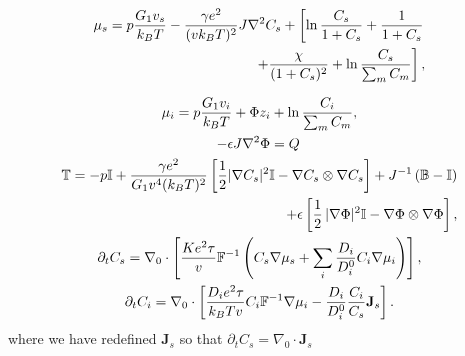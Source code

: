 \begin{gather}
\begin{aligned}
\mu_s = p \frac{G_1v_s}{k_BT} - \frac{\gamma e^2}{(vk_BT)^2} J \nabla^2 C_s + \left[\ln \frac{C_s}{1+C_s} + \frac{1}{1+C_s}\right.\\
\left.\ \ \ \ \ \ +\frac{\chi}{(1+C_s)^2} + \ln \frac{C_s}{\sum_m C_m} \right], 
\end{aligned}\\[2.5mm]
\mu_i = p \frac{G_1v_i}{k_BT} + \Phi z_i + \ln \frac{C_i}{\sum_m C_m} ,\\
-\epsilon J \nabla^2 \Phi = Q\, \\
\begin{aligned}
\mathbb{T}= -p \mathbb{I} +\frac{\gamma e^2}{G_1v^4(k_BT)^2} \left[\frac{1}{2} |\nabla C_s|^2\mathbb{I} - \nabla C_s \otimes \nabla C_s\right]+ J^{-1}\left(\mathbb{B}-\mathbb{I}\right)\\
+ \epsilon \left[\frac{1}{2} \,|\nabla \Phi|^2\mathbb{I} -\nabla \Phi \otimes \nabla \Phi\right],
\end{aligned}\\
\partial_t C_s=\nabla_0 \cdot\left[\frac{K e^2\tau}{v}  \mathbb{F}^{-1}\left(C_s\nabla \mu_s +\sum_i \frac{D_i}{D^0_i} C_i \nabla \mu_i\right)\right],\\
\partial_t C_i= \nabla_0\cdot\left[\frac{D_ie^2\tau}{k_BTv}C_i\mathbb{F}^{-1}\nabla \mu_i -\frac{D_i}{D^0_i} \frac{C_i}{C_s} \mathbf{J}_s\right].
\end{gather}
where we have redefined $\mathbf{J}_s$ so that $\partial_tC_s=\nabla_0 \cdot \mathbf{J}_s$